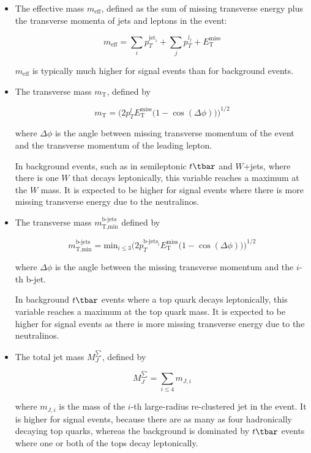 \begin{itemize}[label=]

	\item The effective mass $m_{\text{eff}}$, defined as the sum of missing
	      transverse energy plus the transverse momenta of jets and leptons in the event:

	      $$m_{\text{eff}} = \sum_i p_T^{\text{jet}_i} + \sum_j p_T^{l_j} + E_{\text{T}}^{\text{miss}}$$

	      $m_{\text{eff}}$ is typically much higher for signal events than for background events.


	\item The transverse mass $m_{\text{T}}$, defined by

	      $$m_{\text{T}} = \bigg(2p_T^l E_{\text{T}}^{\text{miss}} \big(1 - \cos(\Delta\phi) \big) \bigg)^{1/2}$$

	      where $\Delta \phi$ is the angle between missing transverse momentum of the
	      event and the transverse momentum of the leading lepton.

	      In background events, such as in semileptonic $t\tbar$ and $W$+jets, where
	      there is one $W$ that decays leptonically, this variable reaches a maximum at
	      the $W$ mass. It is expected to be higher for signal events where there is more
	      missing transverse energy due to the neutralinos.


	\item The transverse mass $m_{\text{T,min}}^{\text{b-jets}}$ defined by

	      $$m_{\text{T,min}}^{\text{b-jets}} = \text{min}_{i\leq 3} \bigg(2
		      p_T^{\text{b-jets}_i} E_{\text{T}}^{\text{miss}} \big( 1 -
		      \cos(\Delta\phi)\big) \bigg)^{1/2}$$

	      where $\Delta \phi$ is the angle between the missing transverse momentum and
	      the $i$-th b-jet.

	      In background $t\tbar$ events where a top quark decays leptonically, this
	      variable reaches a maximum at the top quark mass. It is expected to be higher
	      for signal events as there is more missing transverse energy due to the
	      neutralinos.

	\item The total jet mass $M_J^{\sum}$, defined by

	      $$M_J^{\sum} = \sum_{i\leq 4}m_{J, i} $$

	      where $m_{J, i}$ is the mass of the $i$-th large-radius re-clustered jet in the
	      event. It is higher for signal events, because there are as many as four
	      hadronically decaying top quarks, whereas the background is dominated by
	      $t\tbar$ events where one or both of the tops decay leptonically.

\end{itemize}


